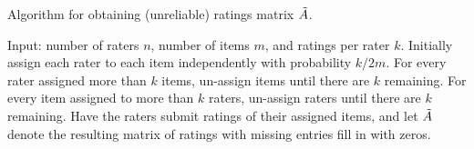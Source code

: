 \begin{algorithm}[b!]
\caption{Algorithm for obtaining (unreliable) ratings matrix $\tilde{A}$.}
\label{alg:create-A}
\begin{algorithmic}[1]
\State Input: number of raters $n$,  number of items $m$, and ratings per rater $k$.
\State Initially assign each rater to each item independently with probability $k/2m$.  
\State For every rater assigned more than $k$ items, un-assign items until 
       there are $k$ remaining.
\State For every item assigned to more than $k$
       raters, un-assign raters until there are $k$ remaining.
\State Have the raters submit ratings of their assigned items, and let $\tilde{A}$ 
       denote the resulting matrix of ratings with missing entries fill in with 
       zeros.
\end{algorithmic}
\end{algorithm}


